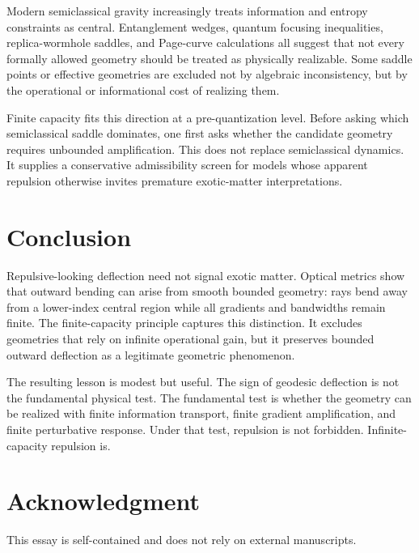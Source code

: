 \documentclass[11pt]{article}
\begin{document}
Modern semiclassical gravity increasingly treats information and entropy constraints as central.  Entanglement wedges, quantum focusing inequalities, replica-wormhole saddles, and Page-curve calculations all suggest that not every formally allowed geometry should be treated as physically realizable.  Some saddle points or effective geometries are excluded not by algebraic inconsistency, but by the operational or informational cost of realizing them.

Finite capacity fits this direction at a pre-quantization level.  Before asking which semiclassical saddle dominates, one first asks whether the candidate geometry requires unbounded amplification.  This does not replace semiclassical dynamics.  It supplies a conservative admissibility screen for models whose apparent repulsion otherwise invites premature exotic-matter interpretations.

\section{Conclusion}

Repulsive-looking deflection need not signal exotic matter.  Optical metrics show that outward bending can arise from smooth bounded geometry: rays bend away from a lower-index central region while all gradients and bandwidths remain finite.  The finite-capacity principle captures this distinction.  It excludes geometries that rely on infinite operational gain, but it preserves bounded outward deflection as a legitimate geometric phenomenon.

The resulting lesson is modest but useful.  The sign of geodesic deflection is not the fundamental physical test.  The fundamental test is whether the geometry can be realized with finite information transport, finite gradient amplification, and finite perturbative response.  Under that test, repulsion is not forbidden.  Infinite-capacity repulsion is.

\section*{Acknowledgment}

This essay is self-contained and does not rely on external manuscripts.
\end{document}
